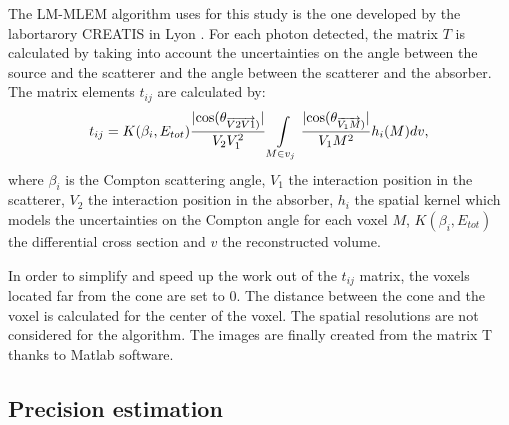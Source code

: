 The LM-MLEM algorithm uses for this study is the one developed by the labortarory CREATIS in Lyon \cite{maxim_analytical_2009,lojacono_low_2013,maxim_filtered_2014,hilaire_compton_2014}.\newline
For each photon detected, the matrix $T$ is calculated by taking into account the uncertainties on the angle between the source and the scatterer and the angle between the scatterer and the absorber.
The matrix elements  $t_{ij}$  are calculated by:
\begin{equation}
 t_{ij} = K(\beta_i,E_{tot})\frac{|\rm{cos}(\theta_{\overrightarrow{V2V1})} |}{V_2V_1^2} \int\limits_{M\in v_j} \frac{|\rm{cos}(\theta_{\overrightarrow{V_1M})}| }{V_1M^2} h_i(M)dv,
 \label{eq:equation_tij_compton_med_nucleaire}\newline
\end{equation}
where $\beta_i$ is the Compton scattering angle, $V_1$ the interaction position in the scatterer, $V_2$ the interaction position in the absorber, $h_i$ the spatial kernel which models the uncertainties on the Compton angle for each voxel $M$, $K(\beta_i,E_{tot})$ the differential cross section and $v$ the reconstructed volume.\newline

In order to simplify and speed up the work out of the $t_{ij}$ matrix, the voxels located far from the cone are set to 0. The distance between the cone and the voxel is calculated for the center of the voxel. The spatial resolutions are not considered for the algorithm.\newline
The images are finally created from the matrix T thanks to Matlab software.

\subsection{Precision estimation}

